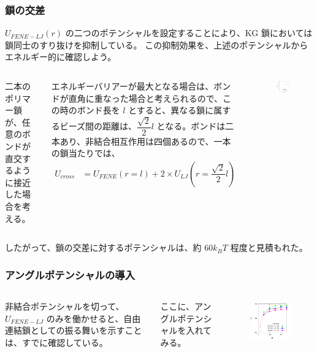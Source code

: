 \documentclass[11pt, dvipdfmx]{beamer}
\begin{document}
\begin{appendix}
\begin{frame}
\frametitle{鎖の交差}
\footnotesize
$U_{FENE-LJ}(r)$ の二つのポテンシャルを設定することにより、KG 鎖においては鎖同士のすり抜けを抑制している。
この抑制効果を、上述のポテンシャルからエネルギー的に確認しよう。

\scriptsize
\begin{columns}[totalwidth=1\textwidth]
二本のポリマー鎖が、任意のボンドが直交するように接近した場合を考える。

エネルギーバリアーが最大となる場合は、ボンドが直角に重なった場合と考えられるので、この時のボンド長を $l$ とすると、異なる鎖に属するビーズ間の距離は、$\dfrac{\sqrt{2}}{2}l$ となる。ボンドは二本あり、非結合相互作用は四個あるので、一本の鎖当たりでは、
\tiny
\begin{align*}
U_{cross}
	&=U_{FENE}(r=l) +  2\times U_{LJ}(r=\dfrac{\sqrt{2}}{2}l)
\end{align*}

\begin{figure}
\centering
\includegraphics[width=50mm]{./fig/Cross_KG.pdf}
\end{figure}
\end{columns}

したがって、鎖の交差に対するポテンシャルは、約 $60 k_BT$ 程度と見積もれた。
\end{frame}

\begin{frame}
\frametitle{アングルポテンシャルの導入}

\begin{columns}[totalwidth=1\textwidth]
非結合ポテンシャルを切って、$U_{FENE-LJ}$ のみを働かせると、自由連結鎖としての振る舞いを示すことは、すでに確認している。

ここに、アングルポテンシャルを入れてみる。
\begin{figure}
\centering
\includegraphics[width=60mm]{./fig/C_ratio_angle.pdf}
\end{figure}
\end{columns}


\end{frame}
\end{appendix}
\end{document}
